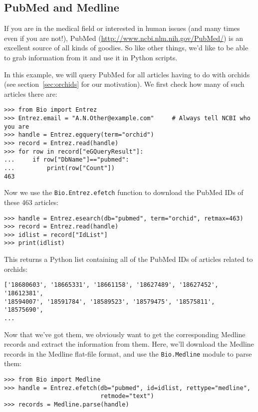 \documentclass{report}
\begin{document}
\subsection{PubMed and Medline}
\label{subsec:pub_med}

If you are in the medical field or interested in human issues (and many times even if you are not!), PubMed (\url{http://www.ncbi.nlm.nih.gov/PubMed/}) is an excellent source of all kinds of goodies. So like other things, we'd like to be able to grab information from it and use it in Python scripts.

In this example, we will query PubMed for all articles having to do with orchids (see section~\ref{sec:orchids} for our motivation). We first check how many of such articles there are:

\begin{verbatim}
>>> from Bio import Entrez
>>> Entrez.email = "A.N.Other@example.com"     # Always tell NCBI who you are
>>> handle = Entrez.egquery(term="orchid")
>>> record = Entrez.read(handle)
>>> for row in record["eGQueryResult"]:
...     if row["DbName"]=="pubmed":
...         print(row["Count"])
463
\end{verbatim}

Now we use the \verb+Bio.Entrez.efetch+ function to download the PubMed IDs of these 463 articles:
\begin{verbatim}
>>> handle = Entrez.esearch(db="pubmed", term="orchid", retmax=463)
>>> record = Entrez.read(handle)
>>> idlist = record["IdList"]
>>> print(idlist)
\end{verbatim}


This returns a Python list containing all of the PubMed IDs of articles related to orchids:
\begin{verbatim}
['18680603', '18665331', '18661158', '18627489', '18627452', '18612381',
'18594007', '18591784', '18589523', '18579475', '18575811', '18575690',
...
\end{verbatim}

Now that we've got them, we obviously want to get the corresponding Medline records and extract the information from them. Here, we'll download the Medline records in the Medline flat-file format, and use the \verb+Bio.Medline+ module to parse them:
\begin{verbatim}
>>> from Bio import Medline
>>> handle = Entrez.efetch(db="pubmed", id=idlist, rettype="medline",
                           retmode="text")
>>> records = Medline.parse(handle)
\end{verbatim}
\end{document}
